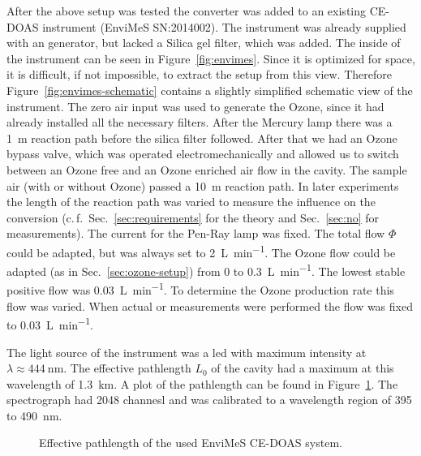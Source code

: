 After the above setup was tested the converter was added to an
existing CE-DOAS instrument (EnviMeS SN:2014002).  The instrument was
already supplied with an  generator, but lacked a Silica gel
filter, which was added. The inside of the instrument can be seen in
Figure~\ref{fig:envimes}. Since it is optimized for space, it is
difficult, if not impossible, to extract the setup from this
view. Therefore Figure~\ref{fig:envimes-schematic} contains a slightly
simplified schematic view of the instrument. The zero air input was
used to generate the Ozone, since it had already installed all the
necessary filters. After the Mercury lamp there was a \SI{1}{\meter}
reaction path before the silica filter followed. After that we had an
Ozone bypass valve, which was operated electromechanically and allowed
us to switch between an Ozone free and an Ozone enriched air flow in
the cavity. The sample air (with or without Ozone) passed a
\SI{10}{\meter} reaction path. In later experiments the length of the
reaction path was varied to measure the influence on the 
conversion (c.\,f.\ Sec.~\ref{sec:requirements} for the theory and
Sec.~\ref{sec:no} for measurements). The current for the Pen-Ray lamp
was fixed. The total flow $\Phi$ could be adapted, but was always set to
\SI{2}{\liter\per\minute}. The Ozone flow could be adapted (as in
Sec.~\ref{sec:ozone-setup}) from 0 to \SI{0.3}{\liter\per\minute}. The
lowest stable positive flow was \SI{0.03}{\liter\per\minute}. To
determine the Ozone production rate this flow was varied. When actual
 or  measurements were performed the flow was fixed to
\SI{0.03}{\liter\per\minute}.

The light source of the instrument was a led with maximum intensity at
$\lambda \approx \SI{444}{\nano\meter}$. The effective pathlength $L_0$ of
the cavity had a maximum at this wavelength of
\SI{1.3}{\kilo\meter}. A plot of the pathlength can be found in
Figure~\ref{fig:pathlength}. The spectrograph had \num{2048} channesl
and was calibrated to a wavelength region of \num{395} to
\SI{490}{\nano\meter}.

\begin{figure}[htbp]
  \centering
  
  \caption{Effective pathlength of the used EnviMeS CE-DOAS system.}
  \label{fig:pathlength}
\end{figure}


